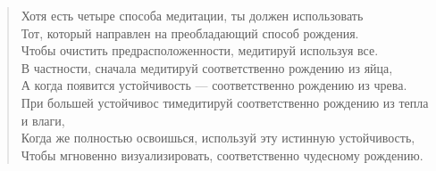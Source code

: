 \begin{verse}
\small
Хотя есть четыре способа медитации, ты должен использовать \\
Тот, который направлен на преобладающий способ рождения. \\
Чтобы очистить предрасположенности, медитируй используя все.\\
В частности, сначала медитируй соответственно рождению из яйца,\\
А когда появится устойчивость — соответственно рождению из чрева.\\
При большей устойчивос тимедитируй соответственно рождению из тепла и влаги,\\
Когда же полностью освоишься, используй эту истинную устойчивость,\\
Чтобы мгновенно визуализировать, соответственно чудесному рождению.
\normalsize
\end{verse}
